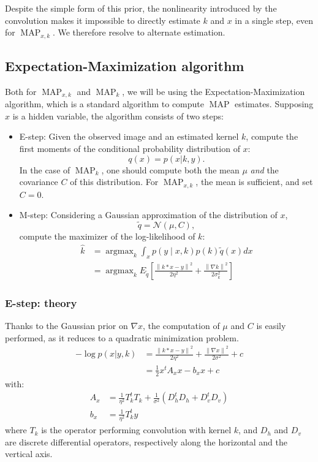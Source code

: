 \documentclass[english,a4paper]{article}
\theoremstyle{plain}
\theoremstyle{definition}
\theoremstyle{remark}
\DeclareMathOperator*{\argmax}{argmax}
\DeclareMathOperator{\MAP}{MAP}
\newcommand{\norm}[1]{\left\lVert #1 \right\rVert}
\begin{document}
Despite the simple form of this prior, the nonlinearity introduced by the convolution makes it impossible to directly estimate $k$ and $x$ in a single step, even for $\MAP_{x,k}$. We therefore resolve to alternate estimation.


\subsection{Expectation-Maximization algorithm}
Both for $\MAP_{x,k}$ and $\MAP_k$, we will be using the Expectation-Maximization algorithm, which is a standard algorithm to compute $\MAP$ estimates.
Supposing $x$ is a hidden variable, the algorithm consists of two steps:
\begin{itemize}
	\item E-step:
	Given the observed image and an estimated kernel $k$, compute the first moments of the conditional probability distribution of $x$:
	\begin{equation}\label{eq:q}
	q(x) = p(x | k,y) .
	\end{equation}
	In the case of $\MAP_k$, one should compute both the mean $\mu$ \emph{and} the covariance $C$ of this distribution. For $\MAP_{x,k}$, the mean is sufficient, and set $C=0$.
	\item M-step:
	Considering a Gaussian approximation of the distribution of $x$,
	\[\tilde{q} = \mathcal{N}(\mu,C) ,\]
	compute the maximizer of the log-likelihood of $k$:
	\begin{align}\label{eq:M_step}
	\hat{k} 
	&= \argmax_k \int_x p(y \mid x,k) p(k) \tilde{q}(x) dx
	\\
	&= \argmax_k E_{\tilde{q}} \left[ \frac{\norm{k*x-y}^2}{2\eta^2} + \frac{\norm{\nabla k}^2}{2\sigma_k^2} \right]
	\end{align}	
\end{itemize}

\subsubsection{E-step: theory}
Thanks to the Gaussian prior on $\nabla x$, the computation of $\mu$ and $C$ is easily performed, as it reduces to a quadratic minimization problem.
\begin{align}\label{eq:e_step_quadratic}
-\log p(x | y,k) &= \frac{\norm{k*x-y}^2}{2\eta^2} + \frac{\norm{\nabla x}^2}{2\sigma^2} + c \nonumber
\\ 
&= \frac{1}{2}x^t A_x x - b_x x + c
\end{align}
with:
\begin{align*}
A_x &= \frac{1}{\eta^2} T_k^t T_k + \frac{1}{\sigma^2}(D_h^t D_h + D_v^t D_v)\\
b_x &= \frac{1}{\eta^2} T_k^t y
\end{align*}
where $T_k$ is the operator performing convolution with kernel $k$, and $D_h$ and $D_v$ are discrete differential operators, respectively along the horizontal and the vertical axis.
\end{document}
